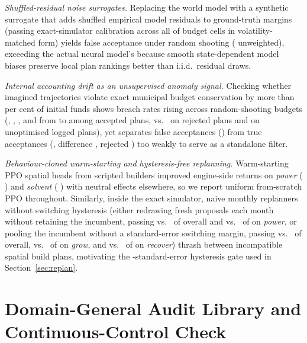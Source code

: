 \emph{Shuffled-residual noise surrogates.} Replacing the world model with a synthetic surrogate that adds shuffled empirical model residuals to ground-truth margins (passing exact-simulator calibration across all \AcceptVolGroups{} of \AcceptVolGroups{} budget cells in volatility-matched form) yields \RandThouVolFloor{} false acceptance under  random shooting (\RandThouPlainFloor{} unweighted), exceeding the actual neural model's \RandThouHack{} because smooth state-dependent model biases preserve local plan rankings better than i.i.d.\ residual draws.

\emph{Internal accounting drift as an unsupervised anomaly signal.} Checking whether imagined trajectories violate exact municipal budget conservation by more than \BreachShare{} per cent of initial funds shows breach rates rising across random-shooting budgets (\TrRandOne{}, \TrRandTen{}, \TrRandHund{}, and \TrRandThou{} from  to  among accepted plans, vs.\ \TrRandThouRej{} on rejected plans and \TrBeh{} on unoptimised logged plans), yet separates false acceptances (\TrSplitWrong{}) from true acceptances (\TrSplitRight{}, difference \TrSplitDiff{} \ci{\TrSplitDiffCI}, rejected \TrSplitRej{}) too weakly to serve as a standalone filter.

\emph{Behaviour-cloned warm-starting and hysteresis-free replanning.} Warm-starting PPO spatial heads from scripted builders improved engine-side returns on \emph{power} (\RlHybridDiffPower{} \ci{\RlHybridDiffPowerCI}) and \emph{solvent} (\RlHybridDiffSolv{} \ci{\RlHybridDiffSolvCI}) with neutral effects elsewhere, so we report uniform from-scratch PPO throughout. Similarly, inside the exact simulator, naive monthly replanners without switching hysteresis (either redrawing fresh proposals each month without retaining the incumbent, passing \RpVOneReplan{} vs.\ \RpVOneOpen{} of \RpVOneN{} overall and \RpVOnePowerReplan{} vs.\ \RpVOnePowerOpen{} of \RpVOnePowerN{} on \emph{power}, or pooling the incumbent without a standard-error switching margin, passing \RpVTwoReplan{} vs.\ \RpVTwoOpen{} of \RpVTwoN{} overall, \RpVTwoGrowReplan{} vs.\ \RpVTwoGrowOpen{} of \RpVTwoGrowN{} on \emph{grow}, and \RpVTwoRecovReplan{} vs.\ \RpVTwoRecovOpen{} of \RpVTwoRecovN{} on \emph{recover}) thrash between incompatible spatial build plans, motivating the \RpSwitchSe{}-standard-error hysteresis gate used in Section~\ref{sec:replan}.

\section{Domain-General Audit Library and Continuous-Control Check}\label{app:external}

